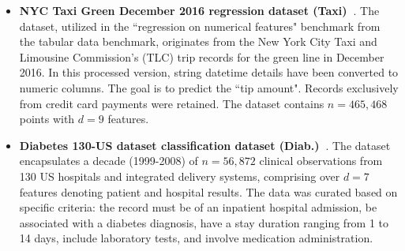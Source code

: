 \begin{itemize}
    \item \textbf{NYC Taxi Green December 2016 regression dataset (Taxi)~\citep{grinsztajn2022tree}}. The dataset, utilized in the ``regression on numerical features" benchmark from the tabular data benchmark, originates from the New York City Taxi and Limousine Commission's (TLC) trip records for the green line in December 2016. In this processed version, string datetime details have been converted to numeric columns. The goal is to predict the ``tip amount". Records exclusively from credit card payments were retained. The dataset contains $n=465,468$ points with $d=9$ features.
    \item \textbf{Diabetes 130-US dataset classification dataset (Diab.)~\citep{strack2014impact}}. The dataset encapsulates a decade (1999-2008) of $n=56,872$ clinical observations from 130 US hospitals and integrated delivery systems, comprising over $d=7$ features denoting patient and hospital results. The data was curated based on specific criteria: the record must be of an inpatient hospital admission, be associated with a diabetes diagnosis, have a stay duration ranging from 1 to 14 days, include laboratory tests, and involve medication administration.
\end{itemize}





